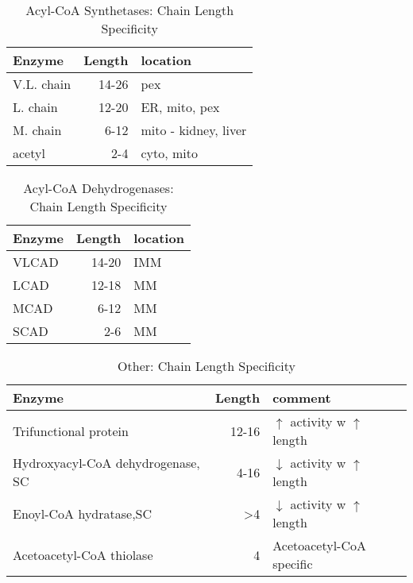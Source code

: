 \documentclass{scrartcl}
\begin{document}
\begin{enumerate}
\begin{table}[htbp]
\caption{\label{tab:org2b967df}
Acyl-CoA Synthetases: Chain Length Specificity}
\centering
\begin{tabular}{lrl}
Enzyme & Length & location\\
\hline
V.L. chain & 14-26 & pex\\
L. chain & 12-20 & ER, mito, pex\\
M. chain & 6-12 & mito - kidney, liver\\
acetyl & 2-4 & cyto, mito\\
\end{tabular}
\end{table}

\begin{table}[htbp]
\caption{\label{tab:orgc864e08}
Acyl-CoA Dehydrogenases: Chain Length Specificity}
\centering
\begin{tabular}{lrl}
Enzyme & Length & location\\
\hline
VLCAD & 14-20 & IMM\\
LCAD & 12-18 & MM\\
MCAD & 6-12 & MM\\
SCAD & 2-6 & MM\\
\end{tabular}
\end{table}


\begin{table}[htbp]
\caption{\label{tab:org0d7ee05}
Other: Chain Length Specificity}
\centering
\begin{tabular}{lrl}
Enzyme & Length & comment\\
\hline
Trifunctional protein & 12-16 & \(\uparrow\) activity w \(\uparrow\) length\\
Hydroxyacyl-CoA dehydrogenase, SC & 4-16 & \(\downarrow\) activity w \(\uparrow\) length\\
Enoyl-CoA hydratase,SC & >4 & \(\downarrow\) activity w \(\uparrow\) length\\
Acetoacetyl-CoA thiolase & 4 & Acetoacetyl-CoA specific\\
\end{tabular}
\end{table}



\end{enumerate}
\end{document}
